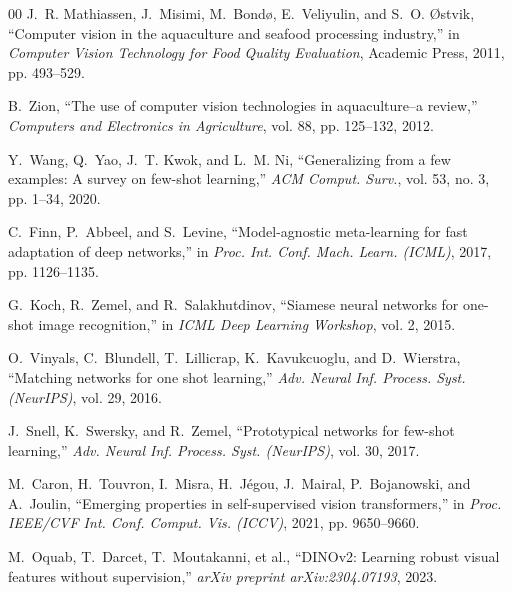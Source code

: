 \documentclass[conference]{IEEEtran}
\begin{document}
\begin{thebibliography}{00}
J.~R. Mathiassen, J.~Misimi, M.~Bond{\o}, E.~Veliyulin, and S.~O. {\O}stvik, ``Computer vision in the aquaculture and seafood processing industry,'' in \textit{Computer Vision Technology for Food Quality Evaluation}, Academic Press, 2011, pp. 493--529.

B.~Zion, ``The use of computer vision technologies in aquaculture--a review,'' \textit{Computers and Electronics in Agriculture}, vol. 88, pp. 125--132, 2012.

Y.~Wang, Q.~Yao, J.~T. Kwok, and L.~M. Ni, ``Generalizing from a few examples: A survey on few-shot learning,'' \textit{ACM Comput. Surv.}, vol. 53, no. 3, pp. 1--34, 2020.

C.~Finn, P.~Abbeel, and S.~Levine, ``Model-agnostic meta-learning for fast adaptation of deep networks,'' in \textit{Proc. Int. Conf. Mach. Learn. (ICML)}, 2017, pp. 1126--1135.

G.~Koch, R.~Zemel, and R.~Salakhutdinov, ``Siamese neural networks for one-shot image recognition,'' in \textit{ICML Deep Learning Workshop}, vol. 2, 2015.

O.~Vinyals, C.~Blundell, T.~Lillicrap, K.~Kavukcuoglu, and D.~Wierstra, ``Matching networks for one shot learning,'' \textit{Adv. Neural Inf. Process. Syst. (NeurIPS)}, vol. 29, 2016.

J.~Snell, K.~Swersky, and R.~Zemel, ``Prototypical networks for few-shot learning,'' \textit{Adv. Neural Inf. Process. Syst. (NeurIPS)}, vol. 30, 2017.

M.~Caron, H.~Touvron, I.~Misra, H.~J{\'e}gou, J.~Mairal, P.~Bojanowski, and A.~Joulin, ``Emerging properties in self-supervised vision transformers,'' in \textit{Proc. IEEE/CVF Int. Conf. Comput. Vis. (ICCV)}, 2021, pp. 9650--9660.

M.~Oquab, T.~Darcet, T.~Moutakanni, et al., ``DINOv2: Learning robust visual features without supervision,'' \textit{arXiv preprint arXiv:2304.07193}, 2023.

\end{thebibliography}
\end{document}
